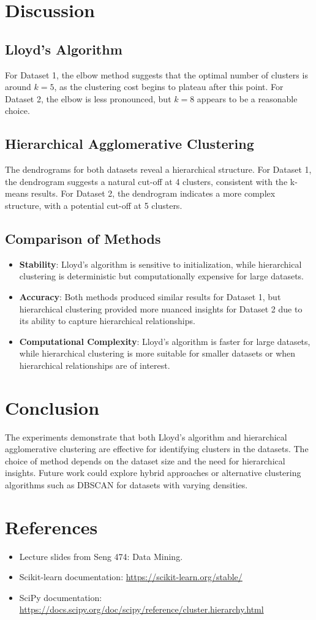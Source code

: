 \documentclass{article}
\begin{document}
\section{Discussion}
\subsection{Lloyd’s Algorithm}
For Dataset 1, the elbow method suggests that the optimal number of clusters is around $k=5$, as the clustering cost begins to plateau after this point. For Dataset 2, the elbow is less pronounced, but $k=8$ appears to be a reasonable choice.

\subsection{Hierarchical Agglomerative Clustering}
The dendrograms for both datasets reveal a hierarchical structure. For Dataset 1, the dendrogram suggests a natural cut-off at 4 clusters, consistent with the k-means results. For Dataset 2, the dendrogram indicates a more complex structure, with a potential cut-off at 5 clusters.

\subsection{Comparison of Methods}
\begin{itemize}
    \item \textbf{Stability}: Lloyd’s algorithm is sensitive to initialization, while hierarchical clustering is deterministic but computationally expensive for large datasets.
    \item \textbf{Accuracy}: Both methods produced similar results for Dataset 1, but hierarchical clustering provided more nuanced insights for Dataset 2 due to its ability to capture hierarchical relationships.
    \item \textbf{Computational Complexity}: Lloyd’s algorithm is faster for large datasets, while hierarchical clustering is more suitable for smaller datasets or when hierarchical relationships are of interest.
\end{itemize}

\section{Conclusion}
The experiments demonstrate that both Lloyd’s algorithm and hierarchical agglomerative clustering are effective for identifying clusters in the datasets. The choice of method depends on the dataset size and the need for hierarchical insights. Future work could explore hybrid approaches or alternative clustering algorithms such as DBSCAN for datasets with varying densities.

\section*{References}
\begin{itemize}
    \item Lecture slides from Seng 474: Data Mining.
    \item Scikit-learn documentation: \url{https://scikit-learn.org/stable/}
    \item SciPy documentation: \url{https://docs.scipy.org/doc/scipy/reference/cluster.hierarchy.html}
\end{itemize}
\end{document}
